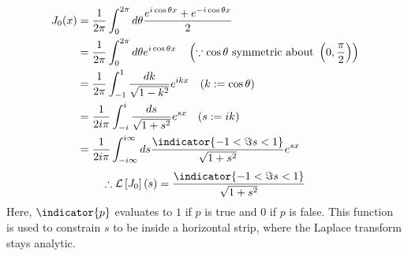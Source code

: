 \item

\begin{align*}
    J_0 (x)
    &= \inv{2\pi} \int_0^{2\pi} d\theta \frac{e^{i\cos\theta x} + e^{-i\cos\theta x}}{2} \\
    &= \inv{2\pi} \int_0^{2\pi} d\theta e^{i\cos\theta x}
    \quad \left( \because \cos\theta \text{ symmetric about } \left( 0, \halfpi \right) \right) \\
    &= \inv{2\pi} \int_{-1}^1 \frac{dk}{\sqrt{1 - k^2}} e^{ikx}
    \quad (k := \cos\theta) \\
    &= \inv{2i\pi} \int_{-i}^i \frac{ds}{\sqrt{1 + s^2}} e^{sx}
    \quad (s := ik) \\
    &= \inv{2i\pi} \int_{-i\infty}^{i\infty} ds \frac{\indicator{-1< \Im s < 1}}{\sqrt{1 + s^2}} e^{sx}
\end{align*}
\[
    \therefore \Lapltransf{J_0}(s)
    = \frac{\indicator{-1 < \Im s < 1}}{\sqrt{1 + s^2}}
\]
Here, $\indicator{p}$ evaluates to $1$ if $p$ is true and $0$ if $p$ is false.
This function is used to constrain $s$ to be inside a horizontal strip,
where the Laplace transform stays analytic.